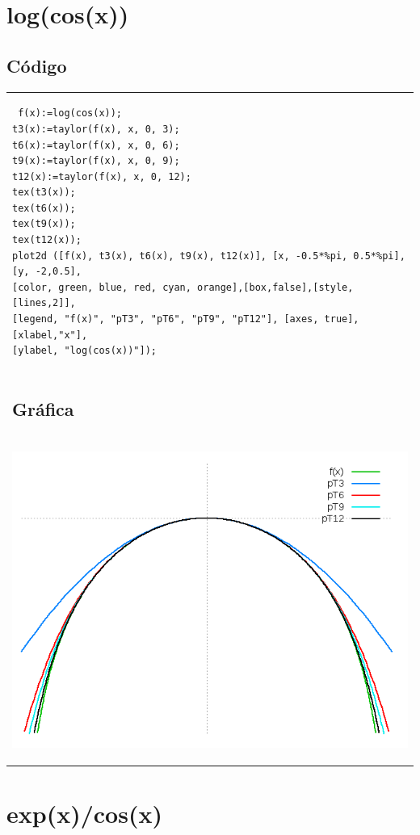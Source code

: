 \documentclass[10pt]{article}
\begin{document}
\section{log(cos(x))}


\subsection{Código}
\begin{tabular}{l}
\begin{verbatim}  
 f(x):=log(cos(x));
t3(x):=taylor(f(x), x, 0, 3);
t6(x):=taylor(f(x), x, 0, 6);
t9(x):=taylor(f(x), x, 0, 9);
t12(x):=taylor(f(x), x, 0, 12);
tex(t3(x));
tex(t6(x));
tex(t9(x));
tex(t12(x));
plot2d ([f(x), t3(x), t6(x), t9(x), t12(x)], [x, -0.5*%pi, 0.5*%pi], [y, -2,0.5],
[color, green, blue, red, cyan, orange],[box,false],[style,[lines,2]],
[legend, "f(x)", "pT3", "pT6", "pT9", "pT12"], [axes, true], [xlabel,"x"], 
[ylabel, "log(cos(x))"]);
\end{verbatim} \\
\subsection{Gráfica}\\
\begin{center}
  
    \includegraphics[scale=0.4]{logcos}
\end{center}
\end{tabular}





\section{exp(x)/cos(x)}
\end{document}
